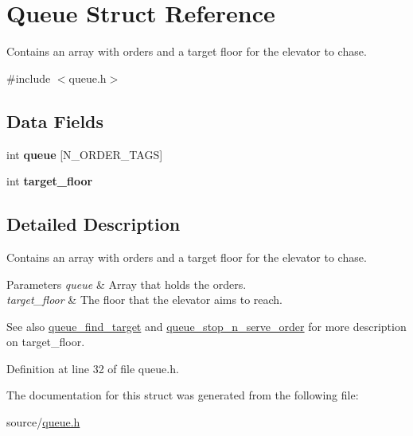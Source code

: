 \hypertarget{structQueue}{}\section{Queue Struct Reference}
\label{structQueue}


Contains an array with orders and a target floor for the elevator to chase.  




{\ttfamily \#include $<$queue.\+h$>$}

\subsection*{Data Fields}
\begin{DoxyCompactItemize}
\item 
\mbox{\label{structQueue_a5009d22561b0a1f0b94883331e98337f}} 
int {\bfseries queue} \mbox{[}N\+\_\+\+O\+R\+D\+E\+R\+\_\+\+T\+A\+GS\mbox{]}
\item 
\mbox{\label{structQueue_a95698e7080ed2265155b7bad70e7cdd7}} 
int {\bfseries target\+\_\+floor}
\end{DoxyCompactItemize}


\subsection{Detailed Description}
Contains an array with orders and a target floor for the elevator to chase. 


\begin{DoxyParams}{Parameters}
{\em queue} & Array that holds the orders. \\
\hline
{\em target\+\_\+floor} & The floor that the elevator aims to reach.\\
\hline
\end{DoxyParams}
\begin{DoxySeeAlso}{See also}
\mbox{\hyperlink{queue_8h_ae1f1f6105b668e5722bd779a25a2439d}{queue\+\_\+find\+\_\+target}} and \mbox{\hyperlink{queue_8h_a6246a25fc3b07b678c031c3dd798e077}{queue\+\_\+stop\+\_\+n\+\_\+serve\+\_\+order}} for more description on {\ttfamily target\+\_\+floor}. 
\end{DoxySeeAlso}


Definition at line 32 of file queue.\+h.



The documentation for this struct was generated from the following file\+:\begin{DoxyCompactItemize}
\item 
source/\mbox{\hyperlink{queue_8h}{queue.\+h}}\end{DoxyCompactItemize}
